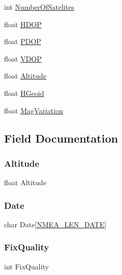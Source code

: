 \begin{DoxyCompactItemize}
\item 
int \hyperlink{struct_g_p_s_ae72a254c408fa9e242352b5cdaf3624b}{Number\+Of\+Satelites}
\item 
float \hyperlink{struct_g_p_s_ab9956f8a7c5930b1a64d60b162559a28}{H\+D\+OP}
\item 
float \hyperlink{struct_g_p_s_a6dd866c20bf7ae6fed7f62afc4470c89}{P\+D\+OP}
\item 
float \hyperlink{struct_g_p_s_a560dd464380970f473ab405e6bd61169}{V\+D\+OP}
\item 
float \hyperlink{struct_g_p_s_acc81deedbd68806fa549c2b92a3d21e0}{Altitude}
\item 
float \hyperlink{struct_g_p_s_af085af3012b86d2fd47a1e84dc085647}{H\+Geoid}
\item 
float \hyperlink{struct_g_p_s_afa9ddeaba839be1104688d66f4584bde}{Mag\+Variation}
\end{DoxyCompactItemize}


\subsection{Field Documentation}
\mbox{\label{struct_g_p_s_acc81deedbd68806fa549c2b92a3d21e0}} 
\subsubsection{\texorpdfstring{Altitude}{Altitude}}
{\footnotesize\ttfamily float Altitude}

\mbox{\label{struct_g_p_s_ad5af8c12c10ef1fa53275723fa3d7c7f}} 
\subsubsection{\texorpdfstring{Date}{Date}}
{\footnotesize\ttfamily char Date\mbox{[}\hyperlink{_n_m_e_a_frame_8h_a843f7aa20dc5f43cd8bdde1c9b60a7a1}{N\+M\+E\+A\+\_\+\+L\+E\+N\+\_\+\+D\+A\+TE}\mbox{]}}

\mbox{\label{struct_g_p_s_a2ff40cecbeb0a88788ea90b5c400df60}} 
\subsubsection{\texorpdfstring{Fix\+Quality}{FixQuality}}
{\footnotesize\ttfamily int Fix\+Quality}


